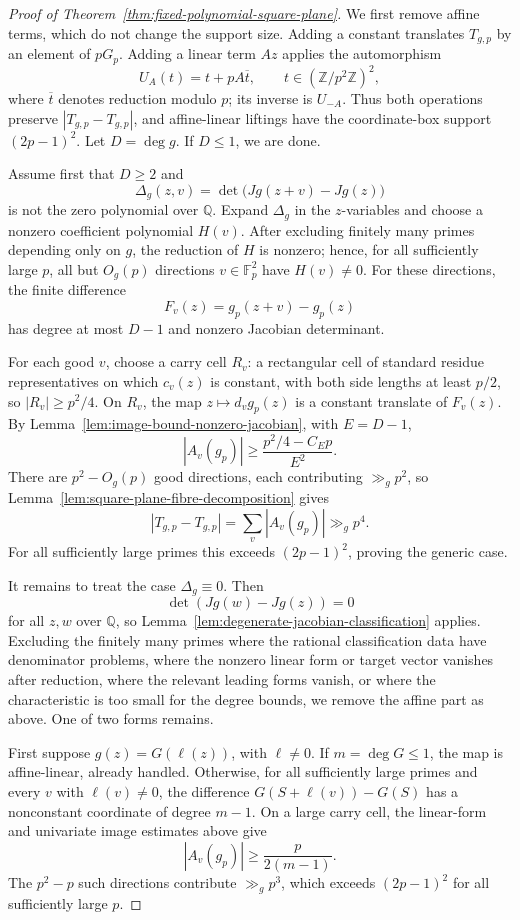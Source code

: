 \documentclass[reqno]{amsart}
\numberwithin{equation}{section}
\theoremstyle{definition}
\begin{document}
\begin{proof}[Proof of Theorem~\ref{thm:fixed-polynomial-square-plane}]
We first remove affine terms, which do not change the support size.  Adding a
constant translates \(T_{g,p}\) by an element of \(pG_p\).  Adding a linear term
\(Az\) applies the automorphism
\[
  U_A(t)=t+pA\overline t,
  \qquad t\in(\mathbb Z/p^2\mathbb Z)^2,
\]
where \(\overline t\) denotes reduction modulo \(p\); its inverse is \(U_{-A}\).
Thus both operations preserve \(|T_{g,p}-T_{g,p}|\), and affine-linear liftings
have the coordinate-box support \((2p-1)^2\).  Let \(D=\deg g\).  If \(D\leq 1\),
we are done.

Assume first that $D\geq 2$ and
\[
  \Delta_g(z,v)=\det\bigl(Jg(z+v)-Jg(z)\bigr)
\]
is not the zero polynomial over $\mathbb Q$.  Expand $\Delta_g$ in the
$z$-variables and choose a nonzero coefficient polynomial $H(v)$.  After
excluding finitely many primes depending only on $g$, the reduction of $H$ is
nonzero; hence, for all sufficiently large $p$, all but $O_g(p)$ directions
$v\in\mathbb F_p^2$ have $H(v)\neq 0$.  For these directions, the finite
difference
\[
  F_v(z)=g_p(z+v)-g_p(z)
\]
has degree at most $D-1$ and nonzero Jacobian determinant.

For each good $v$, choose a carry cell \(R_v\): a rectangular cell of standard
residue representatives on which \(c_v(z)\) is constant, with both side lengths
at least \(p/2\), so \(|R_v|\geq p^2/4\).  On \(R_v\), the map
\(z\mapsto d_v g_p(z)\) is a constant translate of \(F_v(z)\).  By
Lemma~\ref{lem:image-bound-nonzero-jacobian}, with $E=D-1$,
\[
  |A_v(g_p)|\geq \frac{p^2/4-C_Ep}{E^2}.
\]
There are \(p^2-O_g(p)\) good directions, each contributing \(\gg_g p^2\), so
Lemma~\ref{lem:square-plane-fibre-decomposition} gives
\[
  |T_{g,p}-T_{g,p}|=\sum_v |A_v(g_p)|\gg_g p^4.
\]
For all sufficiently large primes this exceeds \((2p-1)^2\), proving the
generic case.

It remains to treat the case $\Delta_g\equiv 0$.  Then
\[
  \det(Jg(w)-Jg(z))=0
\]
for all $z,w$ over $\mathbb Q$, so
Lemma~\ref{lem:degenerate-jacobian-classification} applies.  Excluding the
finitely many primes where the rational classification data have denominator
problems, where the nonzero linear form or target vector vanishes after
reduction, where the relevant leading forms vanish, or where the characteristic
is too small for the degree bounds, we remove the affine part as above.  One of
two forms remains.

First suppose \(g(z)=G(\ell(z))\), with \(\ell\neq 0\).  If
\(m=\deg G\leq 1\), the map is affine-linear, already handled.  Otherwise, for
all sufficiently large primes and every \(v\) with \(\ell(v)\neq 0\), the
difference \(G(S+\ell(v))-G(S)\) has a nonconstant coordinate of degree
\(m-1\).  On a large carry cell, the linear-form and univariate image
estimates above give
\[
  |A_v(g_p)|\geq \frac{p}{2(m-1)}.
\]
The \(p^2-p\) such directions contribute \(\gg_g p^3\), which exceeds
\((2p-1)^2\) for all sufficiently large \(p\).


\end{proof}
\end{document}

